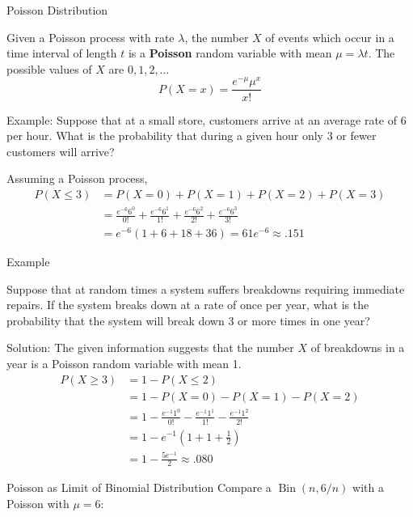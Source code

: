 \documentclass[xcolor=table]{beamer}
\DeclareMathOperator{\Bin}{Bin}
\renewcommand{\emph}{\textbf}
\begin{document}
\begin{frame}{Poisson Distribution}
\begin{block}{}
Given a Poisson process with rate $\lambda$, the number $X$ of events which occur in a time interval of length $t$ is a \emph{Poisson} random variable with mean $\mu=\lambda t$. The possible values of $X$ are $0, 1, 2,\dots$
$$P(X=x)=\frac{e^{-\mu}\mu^x}{x!}$$
\end{block}

\pause \vspace{.1cm} Example: Suppose that at a small store, customers arrive at an average rate of 6 per hour. What is the probability that during a given hour only 3 or fewer customers will arrive?

\pause \vspace{.3cm}Assuming a Poisson process,
\begin{align*}
P(X\leq 3) &= P(X=0)+P(X=1)+P(X=2)+P(X=3) \\
&= \frac{e^{-6}6^0}{0!} + \frac{e^{-6}6^1}{1!} + \frac{e^{-6}6^2}{2!} + \frac{e^{-6}6^3}{3!} \\
&= e^{-6} (1+6 + 18 + 36) = 61e^{-6} \approx .151
\end{align*}
\end{frame}

\begin{frame}{Example}
\begin{block}{}
Suppose that at random times a system suffers breakdowns requiring immediate repairs. If the system breaks down at a rate of once per year, what is the probability that the system will break down 3 or more times in one year?
\end{block}
\pause Solution: The given information suggests that the number $X$ of breakdowns in a year is a Poisson random variable with mean 1. 
\pause \begin{align*}
P(X \geq 3) &= 1 - P(X \leq 2) \\
&= 1 - P(X=0) - P(X=1)-P(X=2) \\
&= 1 - \frac{e^{-1}1^0}{0!} - \frac{e^{-1}1^1}{1!} - \frac{e^{-1}1^2}{2!} \\
&= 1 - e^{-1}\left(1+1+\frac12\right) \\
&= 1 - \frac{5e^{-1}}2 \approx .080
\end{align*}
\end{frame}

\begin{frame}{Poisson as Limit of Binomial Distribution}
Compare a $\Bin(n,6/n)$ with a Poisson with $\mu=6$:
\vspace{-.8cm}
\begin{center}
\end{center}
\end{frame}
\end{document}
